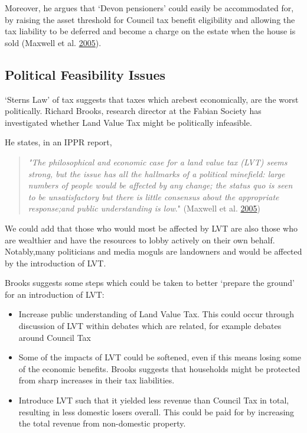 \documentclass[]{tufte-handout}
\providecommand{\tightlist}{%
  \setlength{\itemsep}{0pt}\setlength{\parskip}{0pt}}
\begin{document}
Moreover, he argues that `Devon pensioners' could easily be accommodated
for, by raising the asset threshold for Council tax benefit eligibility
and allowing the tax liability to be deferred and become a charge on the
estate when the house is sold (Maxwell et al.
\protect\hyperlink{ref-Maxwell}{2005}).

\hypertarget{political-feasibility-issues}{%
\subsection{Political Feasibility
Issues}\label{political-feasibility-issues}}

`Sterns Law' of tax suggests that taxes which arebest economically, are
the worst politically. Richard Brooks, research director at the Fabian
Society has investigated whether Land Value Tax might be politically
infeasible.

He states, in an IPPR report,

\begin{quote}
\emph{"The philosophical and economic case for a land value tax (LVT)
seems strong, but the issue has all the hallmarks of a political
minefield: large numbers of people would be affected by any change; the
status quo is seen to be unsatisfactory but there is little consensus
about the appropriate response;and public understanding is low}."
(Maxwell et al. \protect\hyperlink{ref-Maxwell}{2005})
\end{quote}

We could add that those who would most be affected by LVT are also those
who are wealthier and have the resources to lobby actively on their own
behalf. Notably,many politicians and media moguls are landowners and
would be affected by the introduction of LVT.

Brooks suggests some steps which could be taken to better `prepare the
ground' for an introduction of LVT:

\begin{itemize}
\tightlist
\item
  Increase public understanding of Land Value Tax. This could occur
  through discussion of LVT within debates which are related, for
  example debates around Council Tax
\item
  Some of the impacts of LVT could be softened, even if this means
  losing some of the economic benefits. Brooks suggests that households
  might be protected from sharp increases in their tax liabilities.
\item
  Introduce LVT such that it yielded less revenue than Council Tax in
  total, resulting in less domestic losers overall. This could be paid
  for by increasing the total revenue from non-domestic property.
\end{itemize}
\end{document}
